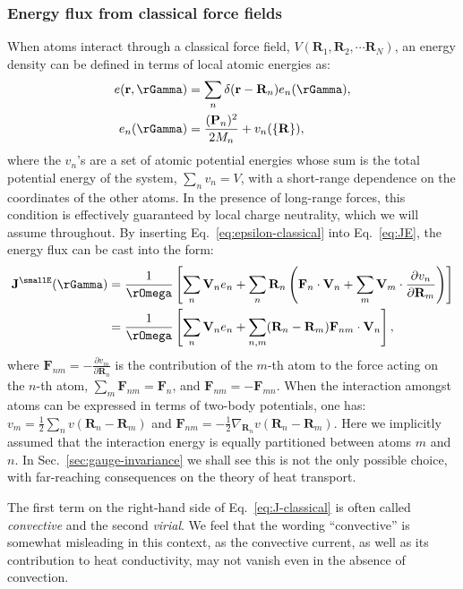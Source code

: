 \subsubsection{Energy flux from classical force fields}
When atoms interact through a classical force field, $V(\mathbf{R}_1,\mathbf{R}_2,\cdots \mathbf{R}_N)$, an energy density can be defined in terms of local atomic energies as:
\begin{align}
  e(\mathbf{r},\rGamma) &= \sum_n \delta(\mathbf{r}-\mathbf{R}_n) e_n(\rGamma), \label{eq:epsilon-classical} \\
  e_n(\rGamma) &= \frac{(\mathbf{P}_n)^2}{2M_n} + v_n(\{\mathbf{R}\}), \label{eq:atomic-energies}
\end{align}
where the $v_n$'s are a set of atomic potential energies whose sum is the total potential energy of the system, $\sum_n v_n=V$, with a short-range dependence on the coordinates of the other atoms. In the presence of long-range forces, this condition is effectively guaranteed by local charge neutrality, which we will assume throughout.
By inserting Eq.~\eqref{eq:epsilon-classical} into Eq.~\eqref{eq:JE}, the energy flux can be cast into the form:
\begin{align}
  \mathbf{J}^\smallE(\rGamma) &=
  \frac{1}{\rOmega} \left[ \sum_n \mathbf{V}_n e_n + \sum_n \mathbf{R}_n
        \left( \mathbf{F}_n \cdot \mathbf{V}_n  + \sum_m \mathbf{V}_m \cdot {\frac{\partial v_n}{\partial \mathbf{R}_m}} \right) \right] \nonumber \\
       &= \frac{1}{\rOmega} \left[ \sum_n \mathbf{V}_n e_n + \sum_{n,m} (\mathbf{R}_n-\mathbf{R}_m) \mathbf{F}_{n m} \cdot \mathbf{V}_n \right], \label{eq:J-classical}
\end{align}
where $\mathbf{F}_{n m} = - \frac{\partial v_m}{\partial \mathbf{R}_n}$ is the contribution of the $m$-th atom to the force acting on the $n$-th atom, $\sum_m \mathbf{F}_{n m} = \mathbf{F}_{n}$, and $\mathbf{F}_{n m} = -\mathbf{F}_{m n}$. When the interaction amongst atoms can be expressed in terms of two-body potentials, one has: $v_m=\frac{1}{2}\sum_n v(\mathbf{R}_n- \mathbf{R}_m)$ and $\mathbf{F}_{n m} = - \frac{1}{2} \nabla_{\mathbf{R}_n} v(\mathbf{R}_n- \mathbf{R}_m)$. Here we implicitly assumed that the interaction energy is equally partitioned between atoms $m$ and $n$. In Sec.~\ref{sec:gauge-invariance} we shall see this is not the only possible choice, with far-reaching consequences on the theory of heat transport.

The first term on the right-hand side of Eq.~\eqref{eq:J-classical} is often called \emph{convective} and the second \emph{virial}. We feel that the wording ``convective'' is somewhat misleading in this context, as the convective current, as well as its contribution to heat conductivity, may not vanish even in the absence of convection.


